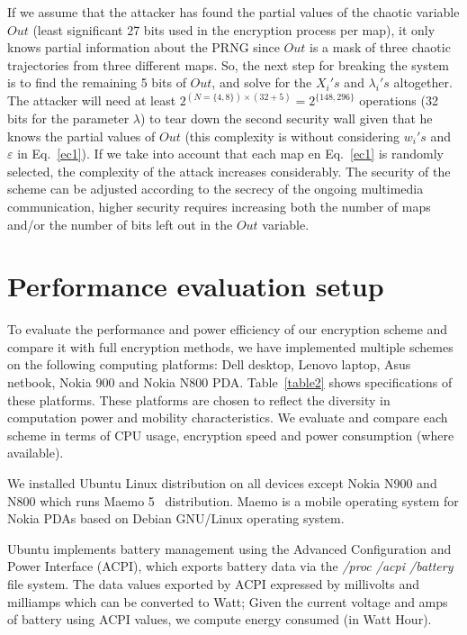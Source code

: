 \documentclass[preprint]{elsarticle}
\begin{document}
If we assume that the attacker has found the partial values of the chaotic variable $Out$ (least significant 27 bits used in the encryption process per map), it only knows partial information about the PRNG since $Out$ is a mask of three chaotic trajectories from three different maps. So, the next step for breaking the system is to find the remaining 5 bits of $Out$, and solve for the $X_{i}'s$ and $\lambda_{i}'s$ altogether. The attacker will need at least $2^{(N=\{4,8\}) \times (32+5)}=2^{\{148,296\}}$ operations (32 bits for the parameter $\lambda$) to tear down the second security wall given that he knows the partial values of $Out$ (this complexity is without considering $w_{i}'s$ and $\varepsilon$ in Eq.~\ref{ec1}). If we take into account that each map en Eq.~\ref{ec1} is randomly selected, the complexity of the attack increases considerably. The security of the scheme can be adjusted according to the secrecy of the ongoing multimedia communication, higher security requires increasing both the number of maps and/or the number of bits left out in the $Out$ variable. 

 
\section{Performance evaluation setup}
\label{evaluationSetup}

To evaluate the performance and power efficiency of our encryption scheme and compare it with full encryption methods, we have implemented multiple schemes on the following computing platforms: Dell desktop, Lenovo laptop, Asus netbook, Nokia 900 and Nokia N800 PDA. Table~\ref{table2} shows specifications of these platforms. These platforms are chosen to reflect the diversity in computation power and mobility characteristics. We evaluate and compare each scheme in terms of CPU usage, encryption speed and power consumption (where available).

We installed Ubuntu Linux distribution on all devices except Nokia N900 and N800 which runs Maemo 5~\cite{linkMaemo} distribution. Maemo is a mobile operating system for Nokia PDAs based on Debian GNU/Linux operating system.

Ubuntu implements battery management using the Advanced Configuration and Power Interface (ACPI), which exports battery data via the \textit{ \slash proc \slash acpi \slash battery} file system. The data values exported by ACPI expressed by millivolts and milliamps which can be converted to Watt; Given the current voltage and amps of battery using ACPI values, we compute energy consumed (in Watt Hour).
\end{document}
